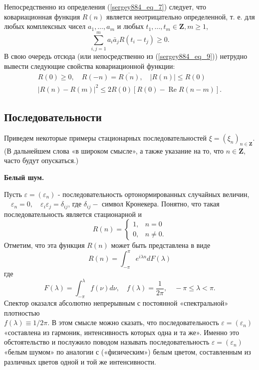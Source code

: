 Непосредственно из определения (\ref{sergey884_eq_7}) следует, что ковариационная функция $R(n)$ является неотрицательно определенной, т. е. для любых комплексных чисел $a_1, \ldots, a_m$ и любых $t_1, \ldots, t_m \in \mathbf{Z}, m \geqslant 1$,
\begin{equation}\label{sergey884_eq_11}
\sum_{i, j=1}^m a_i \bar{a}_j R\left(t_i-t_j\right) \geqslant 0 .
\end{equation}
В свою очередь отсюда (или непосредственно из (\ref{sergey884_eq_9})) нетрудно вывести следующие свойства ковариационной функции:
\begin{equation}\label{sergey884_eq_12}
\begin{gathered}
R(0) \geqslant 0, \quad R(-n)=\overline{R(n)}, \quad|R(n)| \leqslant R(0) \\
|R(n)-R(m)|^2 \leqslant 2 R(0)[R(0)-\operatorname{Re} R(n-m)] .
\end{gathered}
\end{equation}
\newpage
\subsection{Последовательности}
Приведем некоторые примеры стационарных последовательностей $\xi=\left(\xi_n\right)_{n \in \mathbf{Z}}$. (В дальнейшем слова «в широком смысле», а также указание на то, что $n \in \mathbf{Z}$, часто будут опускаться.)\newline

\textbf{Белый шум.}

Пусть $\varepsilon=\left(\varepsilon_n\right)$ - последовательность ортонормированных случайных величин, $\quad \varepsilon_n=0, \quad \varepsilon_i \varepsilon_j=\delta_{i j}$, где $\delta_{i j}-$ символ Кронекера. Понятно, что такая последовательность является стационарной и
$$
R(n)= \begin{cases}1, & n=0 \\ 0, & n \neq 0 .\end{cases}
$$
Отметим, что эта функция $R(n)$ может быть представлена в виде
\begin{equation}\label{sergey884_eq_13}
R(n)=\int_{-\pi}^\pi e^{i \lambda n} d F(\lambda)
\end{equation}
где
\begin{equation}\label{sergey884_eq_14}
F(\lambda)=\int_{-\pi}^\lambda f(\nu) d \nu, \quad f(\lambda)=\frac{1}{2 \pi}, \quad-\pi \leqslant \lambda<\pi .
\end{equation}
Спектор оказался абсолютно непрерывным с постоянной «спектральной» плотностью \\ $f(\lambda) \equiv 1 / 2 \pi$. В этом смысле можно сказать, что последовательность $\varepsilon=\left(\varepsilon_n\right)$ «составлена из гармоник, интенсивность которых одна и та же». Именно это обстоятельство и послужило поводом называть последовательность $\varepsilon=\left(\varepsilon_n\right)$ «белым шумом» по аналогии с («физическим») белым цветом, составленным из различных цветов одной и той же интенсивности.\newline

